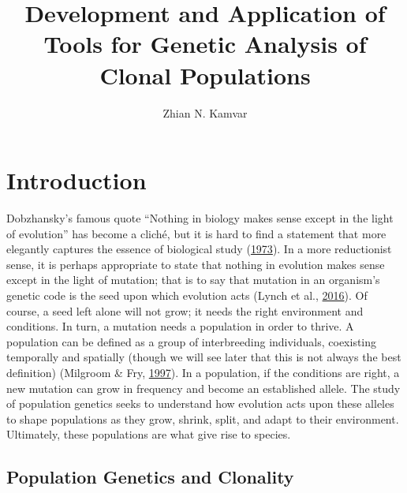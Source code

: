 \documentclass[double,11pt]{beavtex}
\title{Development and Application of Tools for Genetic Analysis of Clonal
Populations} %
\author{Zhian N. Kamvar} %
\begin{document}
\maketitle
\mainmatter


  \chapter{Introduction}\label{introduction}
  
  Dobzhansky's famous quote ``Nothing in biology makes sense except in the
  light of evolution'' has become a cliché, but it is hard to find a
  statement that more elegantly captures the essence of biological study
  (\protect\hyperlink{ref-dobzhansky2013nothing}{1973}). In a more
  reductionist sense, it is perhaps appropriate to state that nothing in
  evolution makes sense except in the light of mutation; that is to say
  that mutation in an organism's genetic code is the seed upon which
  evolution acts (Lynch et al.,
  \protect\hyperlink{ref-lynch2016genetic}{2016}). Of course, a seed left
  alone will not grow; it needs the right environment and conditions. In
  turn, a mutation needs a population in order to thrive. A population can
  be defined as a group of interbreeding individuals, coexisting
  temporally and spatially (though we will see later that this is not
  always the best definition) (Milgroom \& Fry,
  \protect\hyperlink{ref-milgroom1997contributions}{1997}). In a
  population, if the conditions are right, a new mutation can grow in
  frequency and become an established allele. The study of population
  genetics seeks to understand how evolution acts upon these alleles to
  shape populations as they grow, shrink, split, and adapt to their
  environment. Ultimately, these populations are what give rise to
  species.
  
  \section{Population Genetics and
  Clonality}\label{population-genetics-and-clonality}
  
\end{document}
